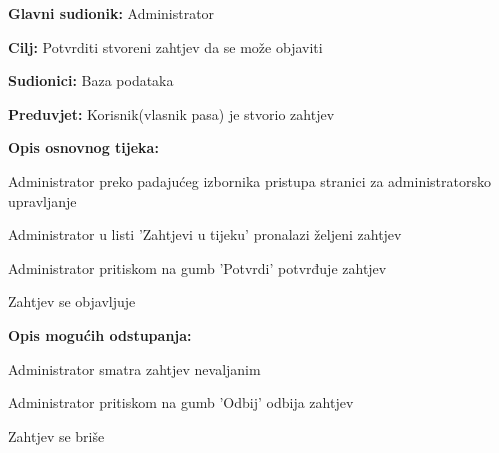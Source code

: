 					\noindent {}
					\begin{packed_item}
						
						\item \textbf{Glavni sudionik: } Administrator
						\item  \textbf{Cilj:} Potvrditi stvoreni zahtjev da se može objaviti
						\item  \textbf{Sudionici:} Baza podataka
						\item  \textbf{Preduvjet:} Korisnik(vlasnik pasa) je stvorio zahtjev
						\item  \textbf{Opis osnovnog tijeka:}
						
						\item[] \begin{packed_enum}
							
							\item Administrator preko padajućeg izbornika pristupa stranici za administratorsko upravljanje
							\item Administrator u listi 'Zahtjevi u tijeku' pronalazi željeni zahtjev
							\item Administrator pritiskom na gumb 'Potvrdi' potvrđuje zahtjev
							\item Zahtjev se objavljuje
							
						\end{packed_enum}
						\item  \textbf{Opis mogućih odstupanja:}
						
						\item[] \begin{packed_item}
							
							\item[3.a] Administrator smatra zahtjev nevaljanim
							\item[] \begin{packed_enum}
								
								\item Administrator pritiskom na gumb 'Odbij' odbija zahtjev
								\item Zahtjev se briše 
								
							\end{packed_enum}
							
						\end{packed_item}
					\end{packed_item}
					
